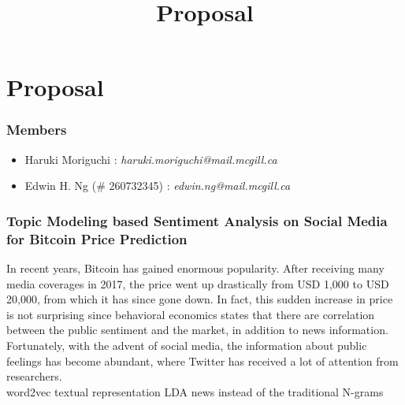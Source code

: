 \documentclass[12pt,a4paper]{report}
\begin{document}
\title{Proposal\\
}


\setcounter{page}{1}
\thispagestyle{empty} 


\chapter*{Proposal}
\subsection*{Members}
\begin{itemize}
\item Haruki Moriguchi : \textit{haruki.moriguchi@mail.mcgill.ca}
\item Edwin H. Ng (\# 260732345) : \textit{edwin.ng@mail.mcgill.ca}
\end{itemize}
\subsection*{Topic Modeling based Sentiment Analysis on Social Media for Bitcoin Price Prediction}
\par \qquad In recent years, Bitcoin has gained enormous popularity. After receiving many media coverages in 2017, the  price went up drastically from USD 1,000 to USD 20,000, from which it has since gone down. In fact, this sudden increase in price is not surprising since behavioral economics states that there are correlation between the public sentiment and the market, in addition to news information. Fortunately, with the advent of social media, the information about public feelings has become abundant, where Twitter has received a lot of attention from researchers.
\\
 word2vec textual representation LDA news instead of the traditional N-grams
\end{document}
